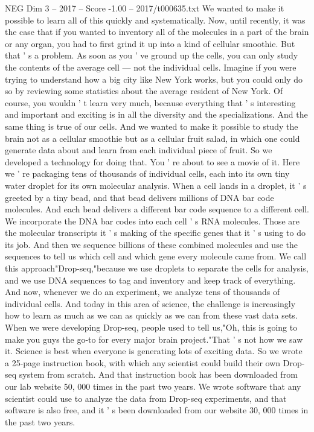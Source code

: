 \begin{textsample}{NEG Dim 3 – 2017 – Score -1.00 – 2017/t000635.txt}
We wanted to make it possible to learn all of this quickly and systematically.
Now, until recently, it was the case that if you wanted to inventory all of the molecules in a part of the brain or any organ, you had to first grind it up into a kind of cellular smoothie.
But that ' s a problem.
As soon as you ' ve ground up the cells, you can only study the contents of the average cell — not the individual cells.
Imagine if you were trying to understand how a big city like New York works, but you could only do so by reviewing some statistics about the average resident of New York.
Of course, you wouldn ' t learn very much, because everything that ' s interesting and important and exciting is in all the diversity and the specializations.
And the same thing is true of our cells.
And we wanted to make it possible to study the brain not as a cellular smoothie but as a cellular fruit salad, in which one could generate data about and learn from each individual piece of fruit.
So we developed a technology for doing that.
You ' re about to see a movie of it.
Here we ' re packaging tens of thousands of individual cells, each into its own tiny water droplet for its own molecular analysis.
When a cell lands in a droplet, it ' s greeted by a tiny bead, and that bead delivers millions of DNA bar code molecules.
And each bead delivers a different bar code sequence to a different cell.
We incorporate the DNA bar codes into each cell ' s RNA molecules.
Those are the molecular transcripts it ' s making of the specific genes that it ' s using to do its job.
And then we sequence billions of these combined molecules and use the sequences to tell us which cell and which gene every molecule came from.
We call this approach"Drop-seq,"because we use droplets to separate the cells for analysis, and we use DNA sequences to tag and inventory and keep track of everything.
And now, whenever we do an experiment, we analyze tens of thousands of individual cells.
And today in this area of science, the challenge is increasingly how to learn as much as we can as quickly as we can from these vast data sets.
When we were developing Drop-seq, people used to tell us,"Oh, this is going to make you guys the go-to for every major brain project."That ' s not how we saw it.
Science is best when everyone is generating lots of exciting data.
So we wrote a 25-page instruction book, with which any scientist could build their own Drop-seq system from scratch.
And that instruction book has been downloaded from our lab website 50, 000 times in the past two years.
We wrote software that any scientist could use to analyze the data from Drop-seq experiments, and that software is also free, and it ' s been downloaded from our website 30, 000 times in the past two years.

\end{textsample}
